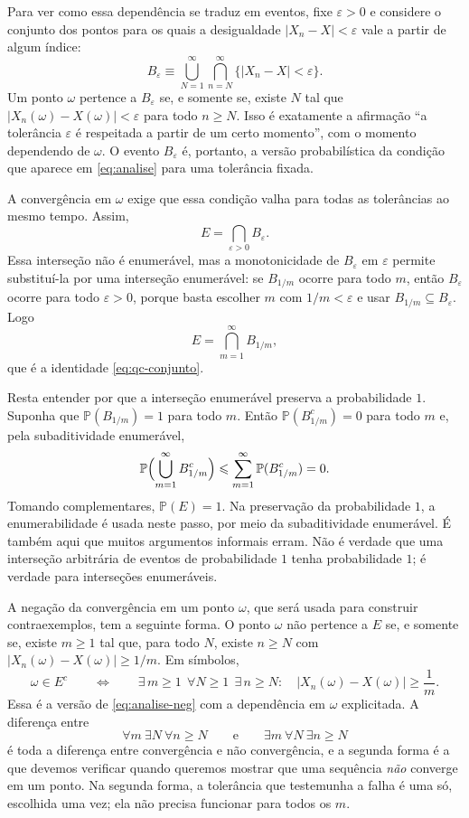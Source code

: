 \documentclass[12pt,portuguese]{article}
\theoremstyle{definition}
\theoremstyle{plainexercise}
\theoremstyle{starredexercise}
\theoremstyle{definition}
\begin{document}
Para ver como essa dependência se traduz em eventos, fixe $\varepsilon>0$ e
considere o conjunto dos pontos para os quais a desigualdade
$|X_n-X|<\varepsilon$ vale a partir de algum índice:
\[
B_\varepsilon
\equiv
\bigcup_{N=1}^{\infty}\bigcap_{n=N}^{\infty}
\bigl\{|X_n-X|<\varepsilon\bigr\}.
\]
Um ponto $\omega$ pertence a $B_\varepsilon$ se, e somente se, existe $N$ tal
que $|X_n(\omega)-X(\omega)|<\varepsilon$ para todo $n\geqslant N$. Isso é
exatamente a afirmação ``a tolerância $\varepsilon$ é respeitada a partir de um
certo momento'', com o momento dependendo de $\omega$. O evento $B_\varepsilon$
é, portanto, a versão probabilística da condição que aparece em
\eqref{eq:analise} para uma tolerância fixada.

A convergência em $\omega$ exige que essa condição valha para todas as
tolerâncias ao mesmo tempo. Assim,
\[
E=\bigcap_{\varepsilon>0}B_\varepsilon.
\]
Essa interseção não é enumerável, mas a monotonicidade de $B_\varepsilon$ em
$\varepsilon$ permite substituí-la por uma interseção enumerável: se
$B_{1/m}$ ocorre para todo $m$, então $B_\varepsilon$ ocorre para todo
$\varepsilon>0$, porque basta escolher $m$ com $1/m<\varepsilon$ e usar
$B_{1/m}\subseteq B_\varepsilon$. Logo
\[
E=\bigcap_{m=1}^{\infty}B_{1/m},
\]
que é a identidade \eqref{eq:qc-conjunto}.

Resta entender por que a interseção enumerável preserva a probabilidade $1$.
Suponha que $\mathbb{P}(B_{1/m})=1$ para todo $m$. Então
$\mathbb{P}(B_{1/m}^c)=0$ para todo $m$ e, pela subaditividade enumerável,
\[
\mathbb{P}\Bigl(\bigcup_{m=1}^{\infty}B_{1/m}^c\Bigr)
\leqslant
\sum_{m=1}^{\infty}\mathbb{P}(B_{1/m}^c)=0.
\]
Tomando complementares, $\mathbb{P}(E)=1$. Na preservação da probabilidade $1$,
a enumerabilidade é usada neste passo, por meio da subaditividade enumerável. É
também aqui que muitos argumentos informais erram. Não é verdade que uma
interseção arbitrária de eventos de probabilidade
$1$ tenha probabilidade $1$; é verdade para interseções enumeráveis.

A negação da convergência em um ponto $\omega$, que será usada para construir
contraexemplos, tem a seguinte forma. O ponto $\omega$ não pertence a $E$ se, e
somente se, existe $m\geqslant1$ tal que, para todo $N$, existe $n\geqslant N$
com $|X_n(\omega)-X(\omega)|\geqslant1/m$. Em símbolos,
\[
\omega\in E^c
\qquad\Longleftrightarrow\qquad
\exists\,m\geqslant1\ \ \forall N\geqslant1\ \ \exists\,n\geqslant N:
\quad |X_n(\omega)-X(\omega)|\geqslant\frac{1}{m}.
\]
Essa é a versão de \eqref{eq:analise-neg} com a dependência em $\omega$
explicitada. A diferença entre
\[
\forall m\ \exists N\ \forall n\geqslant N
\qquad\text{e}\qquad
\exists m\ \forall N\ \exists n\geqslant N
\]
é toda a diferença entre convergência e não convergência, e a segunda forma é
a que devemos verificar quando queremos mostrar que uma sequência \emph{não}
converge em um ponto. Na segunda forma, a tolerância que testemunha a falha é
uma só, escolhida uma vez; ela não precisa funcionar para todos os $m$.
\end{document}
